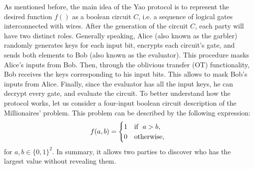 As mentioned before, the main idea of the Yao protocol is to represent the desired function $f()$ as a boolean circuit $C$, i.e. a sequence of logical gates interconnected with wires. After the generation of the circuit $C$, each party will have two distinct roles. Generally speaking, Alice (also known as the garbler) randomly generates keys for each input bit, encrypts each circuit's gate, and sends both elements to Bob (also known as the evaluator). This procedure masks Alice's inputs from Bob. Then, through the oblivious transfer (OT) functionality, Bob receives the keys corresponding to his input bits. This allows to mask Bob's inputs from Alice. Finally, since the evaluator has all the input keys, he can decrypt every gate, and evaluate the circuit. To better understand how the protocol works, let us consider a four-input boolean circuit description of the Millionaires' problem. This problem can be described by the following expression:
\begin{equation}
f(a, b) = 
     \begin{cases} 
      1 & \mathrm{if} \hspace{0.2cm} a>b, \\
      0 & \mathrm{otherwise},
   \end{cases}
\label{eq:MPeq}
\end{equation}   
for $a, b \in \{0,1\}^2$. In summary, it allows two parties to discover who has the largest value without revealing them.


